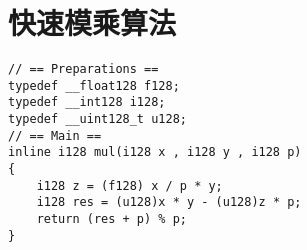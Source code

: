 \section{快速模乘算法}

\begin{verbatim}
// == Preparations ==
typedef __float128 f128;
typedef __int128 i128;
typedef __uint128_t u128;
// == Main ==
inline i128 mul(i128 x , i128 y , i128 p)
{
    i128 z = (f128) x / p * y;
    i128 res = (u128)x * y - (u128)z * p;
    return (res + p) % p;
}
\end{verbatim}